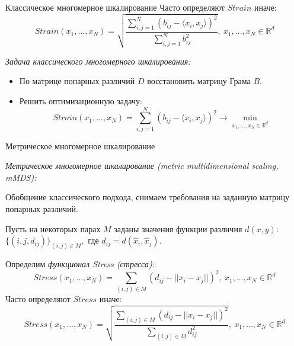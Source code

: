 \documentclass[9pt]{beamer}
\begin{document}
\begin{frame}{Классическое многомерное шкалирование}
        Часто определяют $Strain$ иначе:
    \begin{equation}
    \label{strain2}
        Strain(x_1, ..., x_N) = \sqrt{\dfrac{\sum_{i, j=1}^{N} (b_{ij} - \langle x_i, x_j \rangle)^2}{\sum_{i, j=1}^{N} b_{ij}^2}}, \: x_1, ..., x_N \in \mathbb{R}^d
    \end{equation}
    
    \vspace{\baselineskip}
    \textit{Задача классического многомерного шкалирования:}
        \begin{itemize}
        \item По матрице попарных различий $D$ восстановить матрицу Грама $B$.
        \item Решить оптимизационную задачу:
        \begin{equation}
        Strain(x_1, ..., x_N) = \sum_{i, j=1}^{N} (b_{ij} - \langle x_i, x_j \rangle)^2 \longrightarrow \min_{x_1, ..., x_N \in \mathbb{R}^d}
        \end{equation}
    \end{itemize}
\end{frame}

\begin{frame}{Метрическое многомерное шкалирование}

\textit{Метрическое многомерное шкалирование (metric multidimensional scaling, mMDS):}
    
    \vspace{\baselineskip}
    Обобщение классического подхода, снимаем требования на заданную матрицу попарных различий.
    
     \vspace{\baselineskip}
    Пусть на некоторых парах $M$ заданы значения функции различия $d(x, y)$: $\{(i, j, d_{ij})\}_{(i, j) \in M},$ где $d_{ij} = d(\hat{x}_i, \hat{x}_j)$.
    
    Определим \textit{функционал Stress (стресса)}:
    \begin{equation}
    \label{stress1}
        Stress(x_1, ..., x_N) = \sum_{(i, j) \in M} (d_{ij} - || x_i - x_j ||)^2, \: x_1, ..., x_N \in \mathbb{R}^d
    \end{equation}
    Часто определяют $Stress$ иначе:
    \begin{equation}
    \label{stress2}
        Stress(x_1, ..., x_N) = \sqrt{\dfrac{\sum_{(i, j) \in M} (d_{ij} - || x_i - x_j ||)^2}{\sum_{(i, j) \in M} d_{ij}^2}}, \: x_1, ..., x_N \in \mathbb{R}^d
    \end{equation}
    
\end{frame}
\end{document}

